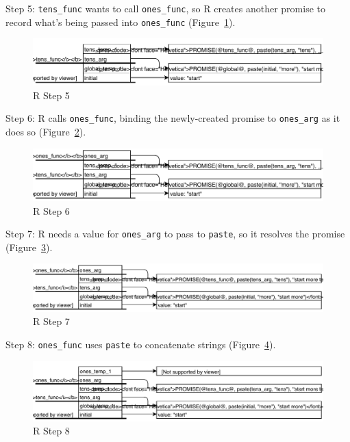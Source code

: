 Step 5:
\texttt{tens\_func} wants to call \texttt{ones\_func},
so R creates another promise to record what's being passed into \texttt{ones\_func}
(Figure~\ref{fig:r-step-5}).

\begin{figure}[h]
  \includegraphics{figures/nse/r-step-05.pdf}
  \caption{R Step 5}
  \label{fig:r-step-5}
\end{figure}

Step 6:
R calls \texttt{ones\_func},
binding the newly-created promise to \texttt{ones\_arg} as it does so
(Figure~\ref{fig:r-step-6}).

\begin{figure}[h]
  \includegraphics{figures/nse/r-step-06.pdf}
  \caption{R Step 6}
  \label{fig:r-step-6}
\end{figure}

Step 7:
R needs a value for \texttt{ones\_arg} to pass to \texttt{paste},
so it resolves the promise
(Figure~\ref{fig:r-step-7}).

\begin{figure}[h]
  \includegraphics{figures/nse/r-step-07.pdf}
  \caption{R Step 7}
  \label{fig:r-step-7}
\end{figure}

Step 8: \texttt{ones\_func} uses \texttt{paste} to concatenate strings
(Figure~\ref{fig:r-step-8}).

\begin{figure}[h]
  \includegraphics{figures/nse/r-step-08.pdf}
  \caption{R Step 8}
  \label{fig:r-step-8}
\end{figure}

